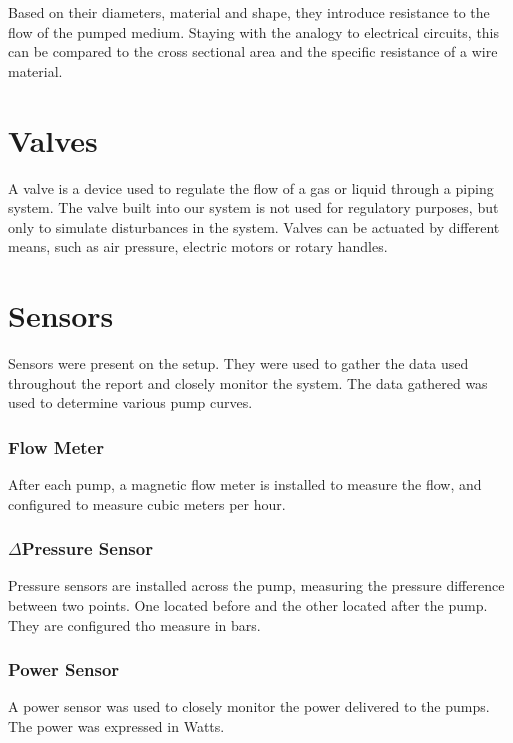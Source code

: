 Based on their diameters, material and shape,
they introduce resistance to the flow of the pumped medium.
Staying with the analogy to electrical circuits,
this can be compared to the cross sectional area and the specific resistance of a wire material.

\section{Valves}
A valve is a device used to regulate the flow of a gas or liquid through a piping system.
The valve built into our system is not used for regulatory purposes,
but only to simulate disturbances in the system.
Valves can be actuated by different means, such as air pressure, electric motors or rotary handles.

\section{Sensors}
Sensors were present on the setup. They were used to gather the data used throughout the report 
and closely monitor the system. The data gathered was used to determine various pump curves.

\subsubsection{Flow Meter}
After each pump, a magnetic flow meter is installed to measure the flow, and configured to measure 
cubic meters per hour.
\subsubsection{$\Delta$Pressure Sensor}
Pressure sensors are installed across the pump, measuring the pressure difference between two points.
One located before and the other located after the pump. They are configured tho measure in bars.
\subsubsection{Power Sensor}
A power sensor was used to closely monitor the power delivered to the pumps. The power was expressed
in Watts.

